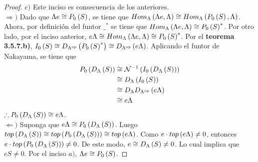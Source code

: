 \documentclass{article}
\begin{document}
\begin{enumerate}[label=\textbf{Ej \arabic*.}]
\begin{proof}
		$\boxed{\text{c)}}$ Este inciso es consecuencia de los anteriores.\\
		$\boxed{\Rightarrow )}$ Dado que $\Lambda e \cong P_{0}\left(S\right)$, se tiene que $Hom_{\Lambda}\left(\Lambda e,\Lambda\right)\cong Hom_{\Lambda}\left(P_{0}\left(S\right),\Lambda\right)$. Ahora, por definición del funtor $\_^{*}$ se tiene que $Hom_{\Lambda}\left(\Lambda e,\Lambda\right)\cong P_{0}\left(S\right)^{*}$. Por otro lado, por el inciso anterior, $e\Lambda\cong Hom_{\Lambda}\left(\Lambda e,\Lambda\right)\cong P_{0}\left(S\right)^{*}$. Por el \textbf{teorema 3.5.7.b)}, $I_{0}\left(S\right) \cong D_{{\Lambda}^{op}}\left(P_{0}\left(S\right)^{*}\right) \cong D_{{\Lambda}^{op}}\left(e\Lambda\right)$. Aplicando el funtor de Nakayama, se tiene que
		\begin{align*}
			P_{0}\left(D_{\Lambda}\left(S\right)\right)&\cong\mathcal{N}^{-1}\left(I_{0}\left(D_{\Lambda}\left(S\right)\right)\right)\\
			&\cong D_{\Lambda}\left(I_{0}\left(S\right)\right)\\
			&\cong D_{\Lambda}D_{{\Lambda}^{op}}\left(e\Lambda\right)\\
			&\cong e\Lambda
		\end{align*}
		$\therefore P_{0}\left(D_{\Lambda}\left(S\right)\right) \cong e\Lambda$.\\
		
		$\boxed{\Leftarrow )}$ Suponga que $e\Lambda \cong P_{0}\left(D_{\Lambda}\left(S\right)\right)$. Luego $top\left(D_{\Lambda}\left(S\right)\right) \cong top\left(P_{0}\left(D_{\Lambda}\left(S\right)\right)\right) \cong top\left(e\Lambda\right)$. Como $e \cdot top\left(e\Lambda\right) \neq 0$, entonces $e \cdot top\left(P_{0}\left(D_{\Lambda}\left(S\right)\right)\right) \neq 0$. De este modo, $e \cong D_{\Lambda}\left(S\right) \neq 0$. Lo cual implica que $eS \neq 0$. Por el inciso $a)$, $\Lambda e \cong P_{0}\left(S\right)$.
	\end{proof}
\end{enumerate}
\end{document}
